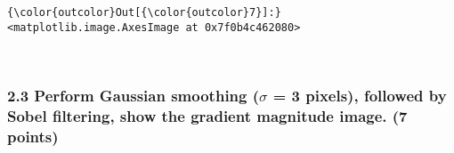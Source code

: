 \documentclass[11pt]{article}
\begin{document}
\begin{Verbatim}[commandchars=\\\{\}]
{\color{outcolor}Out[{\color{outcolor}7}]:} <matplotlib.image.AxesImage at 0x7f0b4c462080>
\end{Verbatim}
            
    \begin{center}
    \end{center}
    { \hspace*{\fill} \\}
    
    \subsubsection{\texorpdfstring{2.3 Perform Gaussian smoothing
(\(\sigma\) = 3 pixels), followed by Sobel filtering, show the gradient
magnitude image. (7
points)}{2.3 Perform Gaussian smoothing (\textbackslash{}sigma = 3 pixels), followed by Sobel filtering, show the gradient magnitude image. (7 points)}}\label{perform-gaussian-smoothing-sigma-3-pixels-followed-by-sobel-filtering-show-the-gradient-magnitude-image.-7-points}
\end{document}
